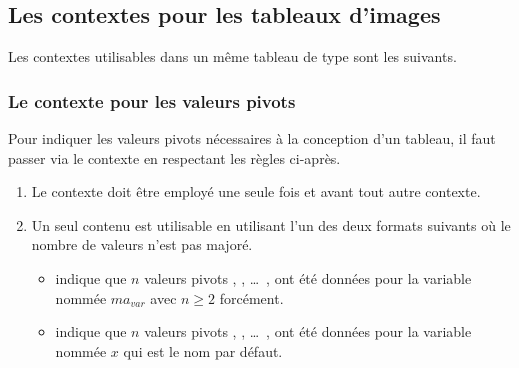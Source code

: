 \documentclass[10pt, a4paper]{article}
\begin{document}

\subsection{Les contextes pour les tableaux d'images}

Les contextes utilisables dans un même tableau de type  sont les suivants.

\medskip

\begin{itemize*}[before = \leavevmode\kern15pt, itemjoin = \kern15pt]
	\item {}

	\item {}
\end{itemize*}




\subsubsection{Le contexte  pour les valeurs pivots}
\label{tns-math-functab-dsl-l3-ctxt-bounds}

Pour indiquer les valeurs pivots nécessaires à la conception d'un tableau, il faut passer via le contexte  en respectant les règles ci-après.
%
\begin{enumerate}
    \item Le contexte  doit être employé une seule fois et avant tout autre contexte.


    \item Un seul contenu est utilisable en utilisant l'un des deux formats suivants où le nombre de valeurs n'est pas majoré.
    \begin{itemize}
        \item {} indique que $n$ valeurs pivots  ,  , \dots\ ,  ont été données pour la variable nommée $ma_{var}$ avec $n \geq 2$ forcément.

        \item {} indique que $n$ valeurs pivots  ,  , \dots\ ,  ont été données pour la variable nommée $x$ qui est le nom par défaut.
    \end{itemize}
\end{enumerate}
\end{document}

